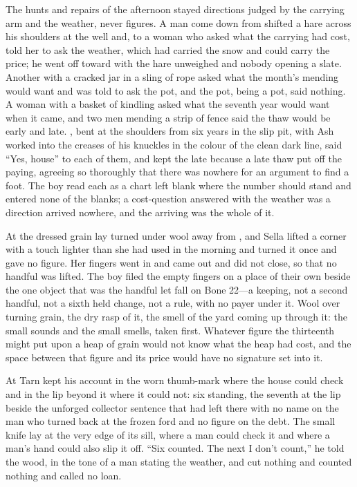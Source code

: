 The hunts and repairs of the afternoon stayed directions judged by the carrying arm and the weather, never figures. A man come down from  shifted a hare across his shoulders at the well and, to a woman who asked what the carrying had cost, told her to ask the weather, which had carried the snow and could carry the price; he went off toward  with the hare unweighed and nobody opening a slate. Another with a cracked jar in a sling of rope asked what the month's mending would want and was told to ask the pot, and the pot, being a pot, said nothing. A woman with a basket of kindling asked what the seventh year would want when it came, and two men mending a strip of fence said the thaw would be early and late. , bent at the shoulders from six years in the slip pit, with Ash worked into the creases of his knuckles in the colour of the clean dark line, said “Yes, house” to each of them, and kept the late because a late thaw put off the paying, agreeing so thoroughly that there was nowhere for an argument to find a foot. The boy read each as a chart left blank where the number should stand and entered none of the blanks; a cost-question answered with the weather was a direction arrived nowhere, and the arriving was the whole of it.

At  the dressed grain lay turned under wool away from , and Sella lifted a corner with a touch lighter than she had used in the morning and turned it once and gave no figure. Her fingers went in and came out and did not close, so that no handful was lifted. The boy filed the empty fingers on a place of their own beside the one object that was the handful let fall on Bone 22---a keeping, not a second handful, not a sixth held change, not a rule, with no payer under it. Wool over turning grain, the dry rasp of it, the smell of the yard coming up through it: the small sounds and the small smells, taken first. Whatever figure the thirteenth might put upon a heap of grain would not know what the heap had cost, and the space between that figure and its price would have no signature set into it.

\scenebreak

At  Tarn kept his account in the worn thumb-mark where the house could check and in the lip beyond it where it could not: six standing, the seventh at the lip beside the unforged collector sentence that  had left there with no name on the man who turned back at the frozen ford and no figure on the debt. The small knife lay at the very edge of its sill, where a man could check it and where a man's hand could also slip it off. “Six counted. The next I don't count,” he told the wood, in the tone of a man stating the weather, and cut nothing and counted nothing and called no loan.

